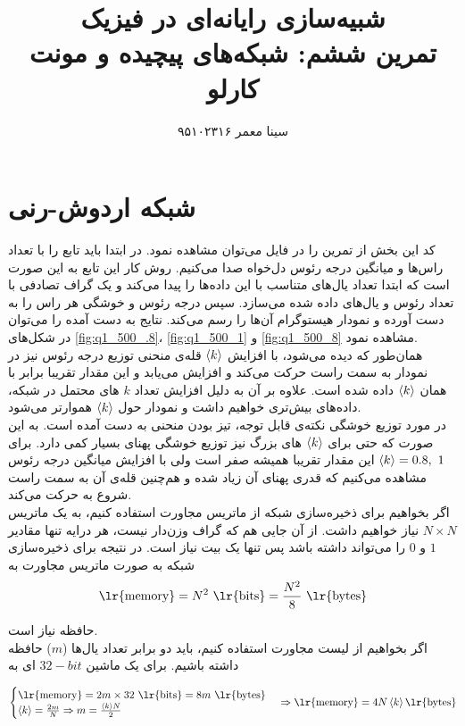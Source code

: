 \documentclass[11pt, a4paper]{article}
\title{\textbf{شبیه‌سازی رایانه‌ای در فیزیک}\\تمرین ششم: شبکه‌های پیچیده و مونت کارلو}
\author{سینا معمر ۹۵۱۰۲۳۱۶}
\begin{document}
\maketitle
\thispagestyle{empty}


\section{\textbf{شبکه اردوش-رنی}}
کد این بخش از تمرین را در فایل
می‌توان مشاهده نمود.
در ابتدا باید تابع
را با تعداد راس‌ها و میانگین درجه رئوس دل‌خواه صدا می‌کنیم.
روش کار این تابع به این صورت است که ابتدا تعداد یال‌های متناسب با این داده‌ها را پیدا می‌کند
و یک گراف تصادفی با تعداد رئوس و یال‌های داده شده می‌سازد.
سپس درجه رئوس و خوشگی هر راس را به دست آورده و نمودار هیستوگرام آن‌ها را رسم می‌کند.
نتایج به دست آمده را می‌توان در شکل‌های
\ref{fig:q1_500_.8}،
\ref{fig:q1_500_1}
و
\ref{fig:q1_500_8}
مشاهده نمود.
\\
همان‌طور که دیده می‌شود، با افزایش
$\braket{k}$
قله‌ی منحنی توزیع درجه رئوس نیز در نمودار به سمت راست حرکت می‌کند و افزایش می‌یابد و این مقدار تقریبا برابر با همان‌
$\braket{k}$
داده شده است.
علاوه بر آن به دلیل افزایش تعداد
$k$
های محتمل در شبکه، داده‌های بیش‌تری خواهیم داشت و نمودار حول
$\braket{k}$
هموارتر می‌شود.
\\
در مورد توزیع خوشگی نکته‌ی قابل توجه،
تیز بودن منحنی به دست آمده است.
به این صورت که حتی برای
$\braket{k}$
های بزرگ نیز توزیع خوشگی پهنای بسیار کمی دارد.
برای
$\braket{k} = 0.8,\ 1$
این مقدار تقریبا همیشه صفر است ولی با افزایش میانگین درجه رئوس مشاهده می‌کنیم که قدری پهنای آن زیاد شده
و هم‌چنین قله‌ی آن به سمت راست شروع به حرکت می‌کند.
\\
اگر بخواهیم برای ذخیره‌سازی شبکه از ماتریس مجاورت استفاده کنیم، به یک ماتریس
$N \times N$
نیاز خواهیم داشت. از آن جایی هم که گراف وزن‌دار نیست، هر درایه تنها مقادیر
$1$
و
$0$
را می‌تواند داشته باشد پس تنها یک بیت نیاز است.
در نتیجه برای ذخیره‌سازی شبکه به صورت ماتریس مجاورت به
\begin{equation}
  \text{\lr{memory}} = N^2 \ \text{\lr{bits}} = \frac{N^2}{8} \ \text{\lr{bytes}}
\end{equation}

حافظه نیاز است.
\\
اگر بخواهیم از لیست مجاورت استفاده کنیم، باید دو برابر تعداد یال‌ها ($m$)
حافظه داشته باشیم. برای یک ماشین
$32-bit$
ای به

\begin{equation}
  \begin{cases}
    \text{\lr{memory}} = 2m \times 32 \ \text{\lr{bits}} = 8m \ \text{\lr{bytes}} \\
    \braket{k} = \frac{2m}{N} \Rightarrow m = \frac{\braket{k}N}{2}
  \end{cases}
  \Rightarrow
  \text{\lr{memory}} = 4N\braket{k} \text{\lr{bytes}}
\end{equation}
\end{document}
